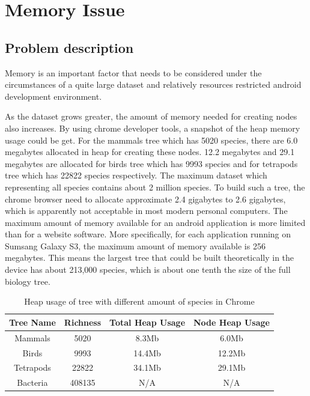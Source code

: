 \documentclass[MSc]{icldt}
\begin{document}
\chapter{Memory Issue}

\section{Problem description}

Memory is an important factor that needs to be considered under the circumstances of a quite large dataset and relatively resources restricted android development environment. 

As the dataset grows greater, the amount of memory needed for creating nodes also increases. By using chrome developer tools,  a snapshot of the heap memory usage could be get. For the mammals tree which has 5020 species, there are 6.0 megabytes allocated in heap for creating these nodes. 12.2 megabytes and 29.1 megabytes are allocated for birds tree which has 9993 species and for tetrapods tree which has 22822 species respectively. The maximum dataset which representing all species contains about 2 million species. To build such a tree, the chrome browser need to allocate approximate 2.4 gigabytes to 2.6 gigabytes, which is apparently not acceptable in most modern personal computers. The maximum amount of memory available for an android application is more limited than for a website software. More specifically, for each application running on Sumsang Galaxy S3, the maximum amount of memory available is 256 megabytes. This means the largest tree that could be built theoretically in the device has about 213,000 species, which is about one tenth the size of the full biology tree. 

\begin{table} [H]
	\centering %
	\begin{tabular}{|c c c c|} %
		\hline %
		Tree Name & Richness  &  Total Heap Usage & Node Heap Usage\\%
		\hline  %
		Mammals & 5020 &  8.3Mb & 6.0Mb\\  %
		\hline
		Birds & 9993 &  14.4Mb & 12.2Mb\\
		\hline
		Tetrapods & 22822 & 34.1Mb & 29.1Mb\\ 
		\hline %
		Bacteria & 408135 & N/A & N/A \\ [1ex] %
		\hline
	\end{tabular}
	\label{table:nonlin} %
	\caption{Heap usage of tree with different amount of species in Chrome} %
\end{table}
\end{document}
